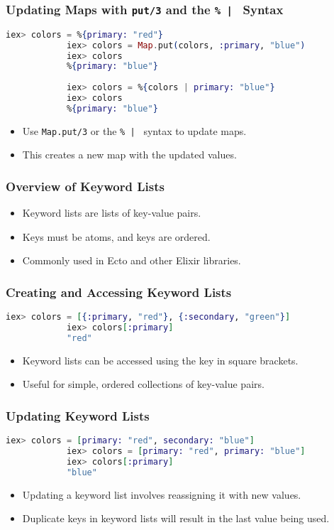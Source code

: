 \documentclass[aspectratio=169, table]{beamer}
\begin{document}
	\begin{frame}[fragile]
		\frametitle{Updating Maps with \texttt{put/3} and the \texttt{\%{ | }} Syntax}
		\begin{lstlisting}[language=Elixir]
			iex> colors = %{primary: "red"}
			iex> colors = Map.put(colors, :primary, "blue")
			iex> colors
			%{primary: "blue"}
			
			iex> colors = %{colors | primary: "blue"}
			iex> colors
			%{primary: "blue"}
		\end{lstlisting}
		\begin{itemize}
			\item Use \texttt{Map.put/3} or the \texttt{\%{ | }} syntax to update maps.
			\item This creates a new map with the updated values.
		\end{itemize}
	\end{frame}
	
	\begin{frame}
		\frametitle{Overview of Keyword Lists}
		\begin{itemize}
			\item Keyword lists are lists of key-value pairs.
			\item Keys must be atoms, and keys are ordered.
			\item Commonly used in Ecto and other Elixir libraries.
		\end{itemize}
	\end{frame}
	
	\begin{frame}[fragile]
		\frametitle{Creating and Accessing Keyword Lists}
		\begin{lstlisting}[language=Elixir]
			iex> colors = [{:primary, "red"}, {:secondary, "green"}]
			iex> colors[:primary]
			"red"
		\end{lstlisting}
		\begin{itemize}
			\item Keyword lists can be accessed using the key in square brackets.
			\item Useful for simple, ordered collections of key-value pairs.
		\end{itemize}
	\end{frame}
	
	\begin{frame}[fragile]
		\frametitle{Updating Keyword Lists}
		\begin{lstlisting}[language=Elixir]
			iex> colors = [primary: "red", secondary: "blue"]
			iex> colors = [primary: "red", primary: "blue"]
			iex> colors[:primary]
			"blue"
		\end{lstlisting}
		\begin{itemize}
			\item Updating a keyword list involves reassigning it with new values.
			\item Duplicate keys in keyword lists will result in the last value being used.
		\end{itemize}
	\end{frame}
	
\end{document}
